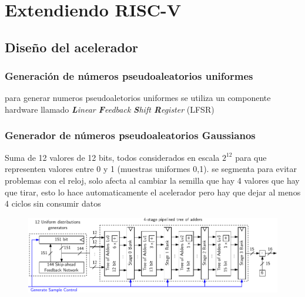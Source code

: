 \chapter{Extendiendo RISC-V}

\section{Diseño del acelerador}

\subsection{Generación de números pseudoaleatorios uniformes}

\todo para generar numeros pseudoaletorios uniformes se utiliza un componente hardware llamado \textit{\textbf{L}inear \textbf{F}eedback \textbf{S}hift \textbf{R}egister} (LFSR)


\subsection{Generador de números pseudoaleatorios Gaussianos}

\todo Suma de 12 valores de 12 bits, todos considerados en escala $2^{12}$ para que representen valores entre 0 y 1 (muestras uniformes 0,1). se segmenta para evitar problemas con el reloj, solo afecta al cambiar la semilla que hay 4 valores que hay que tirar, esto lo hace automaticamente el acelerador pero hay que dejar al menos 4 ciclos sin consumir datos

\begin{figure}[h]
    \centering
    \includegraphics[width=\textwidth]{Imagenes/grng.pdf}
    \caption{\todo}
    \label{fig:aa}
\end{figure}

